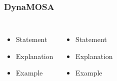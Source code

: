 \begin{frame}
	\frametitle{DynaMOSA}
	
	\begin{columns}[c]
		
		
		\begin{itemize}
			\item Statement
			\item Explanation
			\item Example
		\end{itemize}
		
		
		\begin{itemize}
			\item Statement
			\item Explanation
			\item Example
		\end{itemize}	
		
	\end{columns}
	
\end{frame}